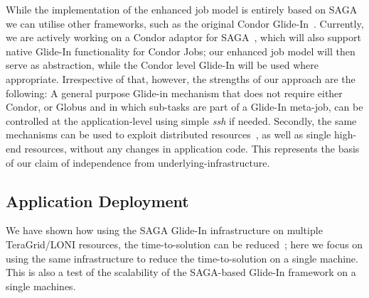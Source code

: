 \documentclass{llncs}
\begin{document}

While the implementation of the enhanced job model is entirely based
on SAGA %
we can utilise other frameworks, such as the original Condor
Glide-In~\cite{citeulike:291860}. %
Currently, we are actively working on a Condor adaptor for
SAGA~\cite{saga_condor_url}, which will also support native Glide-In
functionality for Condor Jobs; our enhanced job model will then serve
as abstraction, while the Condor level Glide-In will be used where
appropriate.  Irrespective of that, however, the strengths of our
approach are the following: A general purpose Glide-in mechanism that
does not require either Condor, or Globus and in which sub-tasks are
part of a Glide-In meta-job, can be controlled at the
application-level using simple {\it ssh} if needed. Secondly, the same
mechanisms can be used to exploit distributed
resources~\cite{repex_ptrsa}, as well as single high-end resources,
without any changes in application code.  This represents the basis of
our claim of independence from underlying-infrastructure.

\up




\subsection{Application Deployment}

\up


We have shown how using the SAGA Glide-In infrastructure on multiple
TeraGrid/LONI resources, the time-to-solution can be
reduced~\cite{Luckow:2008la}; here we focus on using the same
infrastructure to reduce the time-to-solution on a single machine.
This is also a test of the scalability of the SAGA-based Glide-In
framework on a single machines. %
\end{document}

